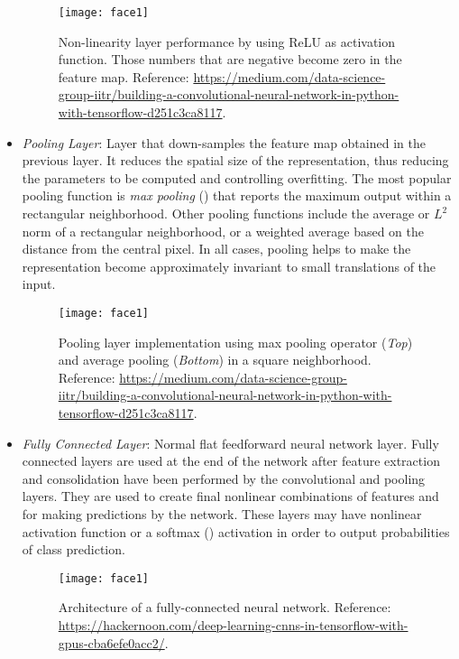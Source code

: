 \documentclass[12pt,a4paper,authoryear]{elsarticle}
\begin{document}
\begin{itemize}
	 	\begin{figure}[H]
	 		\begin{center}
	 			\texttt{[image: face1]}
	 			\caption{Non-linearity layer performance by using ReLU as activation function. Those numbers that are negative become zero in the feature map. Reference: \url{https://medium.com/data-science-group-iitr/building-a-convolutional-neural-network-in-python-with-tensorflow-d251c3ca8117}.}
	 		\end{center}
	 	\end{figure}
	 	
	 	\item \textit{Pooling Layer}: Layer that down-samples the feature map obtained in the previous layer. It reduces the spatial size of the representation, thus reducing the parameters to be computed and controlling overfitting. The most popular pooling function is \textit{max pooling} (\cite{zhou1988computation}) that reports the maximum output within a rectangular neighborhood. Other pooling functions include the average or $L^2$ norm of a rectangular neighborhood, or a weighted average based on the distance from the central pixel. In all cases, pooling helps to make the representation become approximately invariant to small translations of the input.
	 	
	 	\begin{figure}[H]
	 		\begin{center}
	 			\texttt{[image: face1]}
	 			\caption{Pooling layer implementation using max pooling operator (\textit{Top}) and average pooling (\textit{Bottom}) in a square neighborhood. Reference: \url{https://medium.com/data-science-group-iitr/building-a-convolutional-neural-network-in-python-with-tensorflow-d251c3ca8117}.}
	 		\end{center}
	 	\end{figure}
	 	
	 	\item \textit \textit{Fully Connected Layer}: Normal flat feedforward neural network layer. Fully connected layers are used at the end of the network after feature extraction and consolidation have been performed by the convolutional and pooling layers. They are used to create final nonlinear combinations of features and for making predictions by the network. These layers may have nonlinear activation function or a softmax (\cite{nasrabadi2007pattern}) activation in order to output probabilities of class prediction.
	 	
	 	\begin{figure}[H]
	 		\begin{center}
	 			\texttt{[image: face1]}
	 			\caption{Architecture of a fully-connected neural network.  Reference: \url{https://hackernoon.com/deep-learning-cnns-in-tensorflow-with-gpus-cba6efe0acc2/}.}
	 		\end{center}
	 	\end{figure}

	 \end{itemize}
	 
\end{document}
